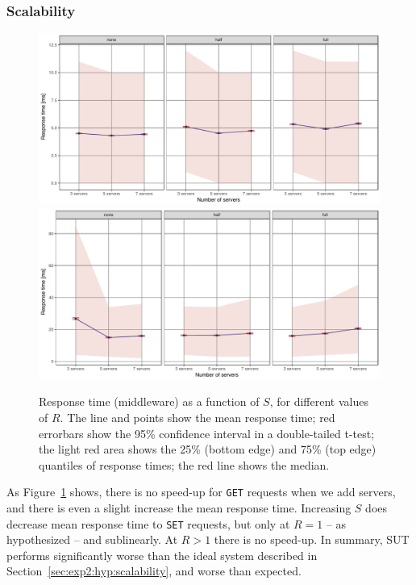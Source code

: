 \documentclass[11pt]{article}
\newcommand{\get}[0]{\texttt{GET}}
\newcommand{\set}[0]{\texttt{SET}}
\begin{document}
\subsubsection{Scalability}
\begin{figure}[h]
\centering
\includegraphics[width=\textwidth]{../results/replication/graphs/response_time_vs_servers_get.pdf}
\includegraphics[width=\textwidth]{../results/replication/graphs/response_time_vs_servers_set.pdf}
\caption{Response time (middleware) as a function of $S$, for different values of $R$. The line and points show the mean response time; red errorbars show the 95\% confidence interval in a double-tailed t-test; the light red area shows the 25\% (bottom edge) and 75\% (top edge) quantiles of response times; the red line shows the median.}
\label{fig:exp2:res:servers}
\end{figure}

As Figure~\ref{fig:exp2:res:servers} shows, there is no speed-up for \get{} requests when we add servers, and there is even a slight increase the mean response time. Increasing $S$ does decrease mean response time to \set{} requests, but only at $R=1$ -- as hypothesized -- and sublinearly. At $R>1$ there is no speed-up. In summary, SUT performs significantly worse than the ideal system described in Section~\ref{sec:exp2:hyp:scalability}, and worse than expected.
\end{document}
